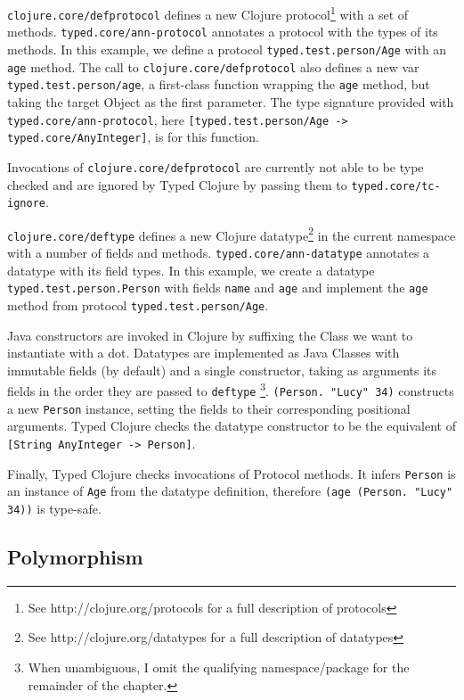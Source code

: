 \lstinline|clojure.core/defprotocol| defines a new Clojure protocol\footnote{See http://clojure.org/protocols for a full description of protocols}
with a set of methods. \lstinline|typed.core/ann-protocol| annotates a protocol with the types of its methods.
In this example, we define a protocol \lstinline|typed.test.person/Age| with an \lstinline|age| method.
The call to \lstinline|clojure.core/defprotocol| also defines a new var \lstinline|typed.test.person/age|, a first-class function
wrapping the \lstinline|age| method, but taking the target Object as the first parameter. The
type signature provided with \lstinline|typed.core/ann-protocol|, here \lstinline|[typed.test.person/Age -> typed.core/AnyInteger]|, 
is for this function.

Invocations of \lstinline|clojure.core/defprotocol| are currently not able to be type checked
and are ignored by Typed Clojure by passing them to \lstinline|typed.core/tc-ignore|.

\lstinline|clojure.core/deftype|
defines a new Clojure datatype\footnote{See http://clojure.org/datatypes for a full description of datatypes}
in the current namespace with a number of fields and methods. 
\lstinline|typed.core/ann-datatype| annotates a datatype with its field types.
In this example, we create a datatype \lstinline|typed.test.person.Person|
with fields \lstinline|name| and \lstinline|age| and implement the \lstinline|age|
method from protocol \lstinline|typed.test.person/Age|.

Java constructors are invoked in Clojure by suffixing the Class we want to instantiate with a dot.
Datatypes are implemented as Java Classes with immutable fields (by default) and a single constructor, taking as arguments its fields 
in the order they are passed to \lstinline|deftype|
\footnote{When unambiguous, I omit the qualifying namespace/package for the remainder of the chapter.}.
\lstinline|(Person. "Lucy" 34)| constructs a new \lstinline|Person|
instance, setting the fields to their corresponding positional arguments.
Typed Clojure checks the datatype constructor to be the equivalent of 
\lstinline|[String AnyInteger -> Person]|.

Finally, Typed Clojure checks invocations of Protocol methods. It infers \lstinline|Person|
is an instance of \lstinline|Age| from the datatype definition, therefore \lstinline|(age (Person. "Lucy" 34))| is type-safe.

\subsection{Polymorphism}

